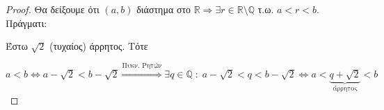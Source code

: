 \documentclass[main.tex]{subfiles}
\begin{document}

\begin{proof}
    Θα δείξουμε ότι $ (a,b) $ διάστημα στο $ \mathbb{R} \Rightarrow \exists r \in 
    \mathbb{R} \setminus \mathbb{Q} $ τ.ω. $a < r < b$. Πράγματι:

    Έστω $ \sqrt{2} $ (τυχαίος) άρρητος. Τότε

    $ a < b \Leftrightarrow a - \sqrt{2} < b- \sqrt{2} \overset{\text{Πυκν. Ρητών}}{\Rightarrow} \exists q \in \mathbb{Q} \; : \;  a - \sqrt{2} < q < b - 
    \sqrt{2} \Leftrightarrow  a < \underbrace{q + \sqrt{2}}_{\text{άρρητος}} < b $ 
\end{proof}
\end{document}
